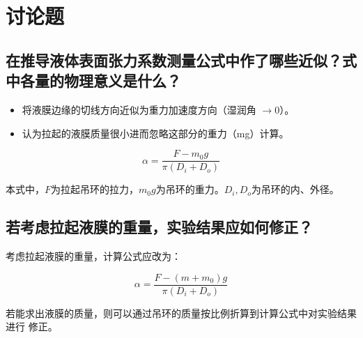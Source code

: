 \documentclass{ctexart}
\begin{document}
\section{讨论题}
\subsection{在推导液体表面张力系数测量公式中作了哪些近似？式中各量的物理意义是什么？}

\begin{itemize}
    \item 将液膜边缘的切线方向近似为重力加速度方向（湿润角 $ \to 0 $）。
    \item 认为拉起的液膜质量很小进而忽略这部分的重力（mg）计算。
\end{itemize}

$$\alpha = \frac{F-m_0g}{\pi (D_i+D_o)}$$

本式中，$F$为拉起吊环的拉力，$m_0g$为吊环的重力。$D_i, D_o$为吊环的内、外径。

\subsection{若考虑拉起液膜的重量，实验结果应如何修正？}
考虑拉起液膜的重量，计算公式应改为：

$$\alpha = \frac{F-(m+m_0)g}{\pi (D_i+D_o)}$$

若能求出液膜的质量，则可以通过吊环的质量按比例折算到计算公式中对实验结果进行
修正。 
\end{document}
